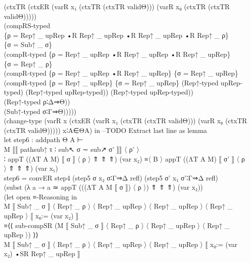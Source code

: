 {\begin{code}
{\>                         (ctxTR (ctxER (varR x₁ (ctxTR (ctxTR validΘ))) (varR x₀ (ctxTR (ctxTR validΘ)))))\<\\
\>                         (compRS-typed\<\\
\>                            \{ρ = Rep↑ \_ upRep •R Rep↑ \_ upRep •R Rep↑ \_ upRep •R Rep↑ \_ ρ\}\<\\
\>                            \{σ = Sub↑ \_ σ\} \<\\
\>                            (compR-typed \{ρ = Rep↑ \_ upRep •R Rep↑ \_ upRep •R Rep↑ \_ upRep\}\<\\
\>                              \{σ = Rep↑ \_ ρ\}\<\\
\>                              (compR-typed \{ρ = Rep↑ \_ upRep •R Rep↑ \_ upRep\} \{σ = Rep↑ \_ upRep\}\<\\
\>                                (compR-typed \{ρ = Rep↑ \_ upRep\} \{σ = Rep↑ \_ upRep\} (Rep↑-typed upRep-typed) (Rep↑-typed upRep-typed)) (Rep↑-typed upRep-typed)) \<\\
\>                            (Rep↑-typed ρ∶Δ⇒Θ))\<\\
\>                         (Sub↑-typed σ∶Γ⇒Θ)))))\<\\
\>                         (change-type (varR x (ctxER (varR x₁ (ctxTR (ctxTR validΘ))) (varR x₀ (ctxTR (ctxTR validΘ))))) x∶A∈ΘA) in --TODO Extract last line as lemma\<\\
\>             let step6 : addpath Θ A ⊢\<\\
\>                         M ⟦⟦ pathsub↑ τ ∶ sub↖ σ ∼ sub↗ σ' ⟧⟧ 〈 ρ' 〉\<\\
\>                         ∶ appT ((ΛT A M) ⟦ σ ⟧ 〈 ρ 〉 ⇑ ⇑ ⇑) (var x₂) ≡〈 B 〉 appT ((ΛT A M) ⟦ σ' ⟧ 〈 ρ 〉 ⇑ ⇑ ⇑) (var x₁)\<\\
\>                 step6 = convER step4 (step5 σ x₂ σ∶Γ⇒Δ refl) (step5 σ' x₁ σ'∶Γ⇒Δ refl)\<\\
\>                         (subst (λ a → a ≃ appT (((ΛT A M ⟦ σ ⟧) 〈 ρ 〉) ⇑ ⇑ ⇑) (var x₂)) \<\\
\>                         (let open ≡-Reasoning in\<\\
\>                           M ⟦ Sub↑ \_ σ ⟧ 〈 Rep↑ \_ ρ 〉 〈 Rep↑ \_ upRep 〉 〈 Rep↑ \_ upRep 〉 〈 Rep↑ \_ upRep 〉 ⟦ x₀:= (var x₂) ⟧\<\\
\>                         ≡⟨⟨ sub-compSR (M ⟦ Sub↑ \_ σ ⟧ 〈 Rep↑ \_ ρ 〉 〈 Rep↑ \_ upRep 〉 〈 Rep↑ \_ upRep 〉) ⟩⟩\<\\
\>                           M ⟦ Sub↑ \_ σ ⟧ 〈 Rep↑ \_ ρ 〉 〈 Rep↑ \_ upRep 〉 〈 Rep↑ \_ upRep 〉 ⟦ x₀:= (var x₂) •SR Rep↑ \_ upRep ⟧\<\\
}
\end{code}}

